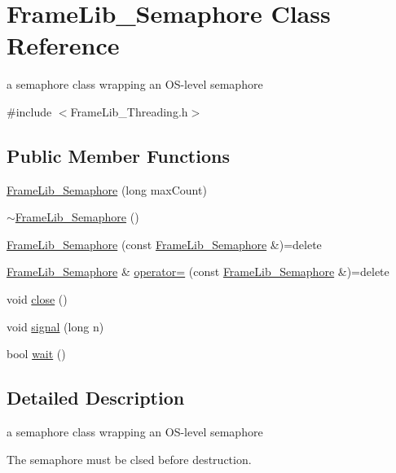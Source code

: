 \hypertarget{class_frame_lib___semaphore}{}\section{Frame\+Lib\+\_\+\+Semaphore Class Reference}
\label{class_frame_lib___semaphore}


a semaphore class wrapping an O\+S-\/level semaphore  




{\ttfamily \#include $<$Frame\+Lib\+\_\+\+Threading.\+h$>$}

\subsection*{Public Member Functions}
\begin{DoxyCompactItemize}
\item 
\hyperlink{class_frame_lib___semaphore_a005822b2888a73b8764a8026b6f88217}{Frame\+Lib\+\_\+\+Semaphore} (long max\+Count)
\item 
\hyperlink{class_frame_lib___semaphore_add006e7bfd2758acfcc4c763c00028eb}{$\sim$\+Frame\+Lib\+\_\+\+Semaphore} ()
\item 
\hyperlink{class_frame_lib___semaphore_adeed1a71cb4555c224115658254e0377}{Frame\+Lib\+\_\+\+Semaphore} (const \hyperlink{class_frame_lib___semaphore}{Frame\+Lib\+\_\+\+Semaphore} \&)=delete
\item 
\hyperlink{class_frame_lib___semaphore}{Frame\+Lib\+\_\+\+Semaphore} \& \hyperlink{class_frame_lib___semaphore_ad8c78aa4866dd72819ff35428736adde}{operator=} (const \hyperlink{class_frame_lib___semaphore}{Frame\+Lib\+\_\+\+Semaphore} \&)=delete
\item 
void \hyperlink{class_frame_lib___semaphore_a5d2d85054c42363761ad4bf37d167d90}{close} ()
\item 
void \hyperlink{class_frame_lib___semaphore_ab46387d91374abb71cae7e2874641119}{signal} (long n)
\item 
bool \hyperlink{class_frame_lib___semaphore_a87e8ba7aa4aba472e9d05c85f0170920}{wait} ()
\end{DoxyCompactItemize}


\subsection{Detailed Description}
a semaphore class wrapping an O\+S-\/level semaphore 

The semaphore must be clsed before destruction. 


